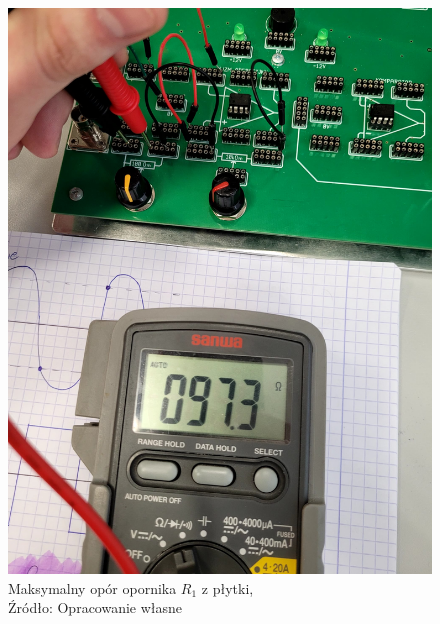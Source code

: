 \documentclass{article}
\begin{document}
    \begin{figure}[!ht]
      \centering
      \includegraphics[scale=0.125]{grafiki/y_max.jpg}
      \caption{Maksymalny opór opornika $R_1$ z płytki,
      \\Źródło: Opracowanie własne}
    \end{figure}
\end{document}
